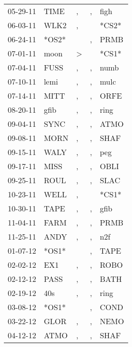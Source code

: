 \begin{supertabular}{lllll}
 05-29-11 &   TIME &                , &             , &   figh \\
 06-03-11 &   WLK2 &                , &               &  *CS2* \\
 06-24-11 &  *OS2* &                  &             , &   PRMB \\
 07-01-11 &   moon &     \textgreater &               &  *CS1* \\
 07-04-11 &   FUSS &                , &             , &   numb \\
 07-10-11 &   lemi &                , &             , &   mulc \\
 07-14-11 &   MITT &                , &             , &   ORFE \\
 08-20-11 &   gfib &                , &             , &   ring \\
 09-04-11 &   SYNC &                , &             , &   ATMO \\
 09-08-11 &   MORN &                , &             , &   SHAF \\
 09-15-11 &   WALY &                , &             , &    peg \\
 09-17-11 &   MISS &                , &             , &   OBLI \\
 09-25-11 &   ROUL &                , &             , &   SLAC \\
 10-23-11 &   WELL &                , &               &  *CS1* \\
 10-30-11 &   TAPE &                , &             , &   gfib \\
 11-04-11 &   FARM &                , &             , &   PRMB \\
 11-25-11 &   ANDY &                , &             , &    n2f \\
 01-07-12 &  *OS1* &                  &             , &   TAPE \\
 02-02-12 &    EX1 &                , &             , &   ROBO \\
 02-12-12 &   PASS &                , &             , &   BATH \\
 02-19-12 &    40s &                , &             , &   ring \\
 03-08-12 &  *OS1* &                  &             , &   COND \\
 03-22-12 &   GLOR &                , &             , &   NEMO \\
 04-12-12 &   ATMO &                , &             , &   SHAF \\

\end{supertabular}
